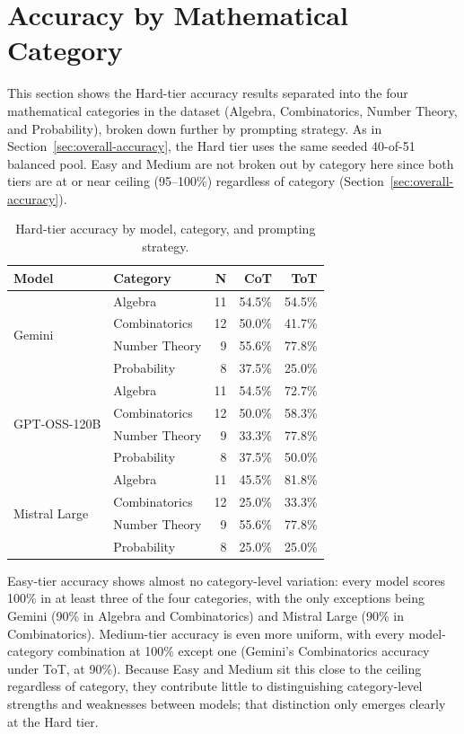 \section{Accuracy by Mathematical Category}
\label{sec:category-accuracy}

This section shows the Hard-tier accuracy results separated into the
four mathematical categories in the dataset (Algebra, Combinatorics,
Number Theory, and Probability), broken down further by prompting
strategy. As in Section~\ref{sec:overall-accuracy}, the Hard tier uses
the same seeded 40-of-51 balanced pool. Easy and Medium are not broken
out by category here since both tiers are at or near ceiling (95--100\%)
regardless of category (Section~\ref{sec:overall-accuracy}).

\begin{table}[H]
  \centering
  \caption{Hard-tier accuracy by model, category, and prompting strategy.}
  \label{tab:accuracy-category}
  \begin{tabular}{llrrr}
    \toprule
    Model & Category & N & CoT & ToT \\
    \midrule
    \multirow{4}{*}{Gemini} & Algebra & 11 & 54.5\% & 54.5\% \\
     & Combinatorics & 12 & 50.0\% & 41.7\% \\
     & Number Theory & 9 & 55.6\% & 77.8\% \\
     & Probability & 8 & 37.5\% & 25.0\% \\
    \midrule
    \multirow{4}{*}{GPT-OSS-120B} & Algebra & 11 & 54.5\% & 72.7\% \\
     & Combinatorics & 12 & 50.0\% & 58.3\% \\
     & Number Theory & 9 & 33.3\% & 77.8\% \\
     & Probability & 8 & 37.5\% & 50.0\% \\
    \midrule
    \multirow{4}{*}{Mistral Large} & Algebra & 11 & 45.5\% & 81.8\% \\
     & Combinatorics & 12 & 25.0\% & 33.3\% \\
     & Number Theory & 9 & 55.6\% & 77.8\% \\
     & Probability & 8 & 25.0\% & 25.0\% \\
    \bottomrule
  \end{tabular}
\end{table}

Easy-tier accuracy shows almost no category-level variation: every
model scores 100\% in at least three of the four categories, with the
only exceptions being Gemini (90\% in Algebra and Combinatorics) and
Mistral Large (90\% in Combinatorics). Medium-tier accuracy is even more
uniform, with every model-category combination at 100\% except one
(Gemini's Combinatorics accuracy under ToT, at 90\%). Because Easy and
Medium sit this close to the ceiling regardless of category, they
contribute little to distinguishing category-level strengths and
weaknesses between models; that distinction only emerges clearly at the
Hard tier.

